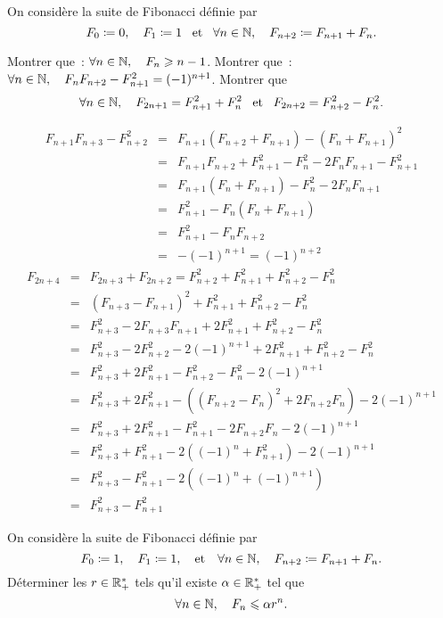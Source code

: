 \documentclass{magnolia}
\begin{document}
On considère la suite de Fibonacci définie par
\[F_0\coloneqq 0,\quad F_1\coloneqq 1 \quad\!\text{et}\quad\! \forall n\in\mathbb{N},\quad F_{n+2}\coloneqq F_{n+1}+F_n.\]
\begin{questions} 
\question Montrer que~: $\forall n\in\mathbb{N},\quad F_n\geqslant n-1$. 
\question Montrer que~: $\forall n\in\mathbb{N},\quad F_nF_{n+2}-F_{n+1}^2=(-1)^{n+1}$. 
\question Montrer que
  \[\forall n\in\mathbb{N},\quad F_{2n+1}=F_{n+1}^2+F_n^2 \quad\!\text{et}\quad\! F_{2n+2}=F_{n+2}^2-F_{n}^2.\]
\end{questions}
\begin{questions}
\question
\question
\begin{eqnarray*}
F_{n+1}F_{n+3}-F_{n+2}^2
&=& F_{n+1}(F_{n+2}+F_{n+1})-(F_n+F_{n+1})^2\\
&=& F_{n+1}F_{n+2}+F_{n+1}^2-F_n^2-2F_n F_{n+1}-F_{n+1}^2\\
&=& F_{n+1}(F_n+F_{n+1}) -F_n^2-2F_n F_{n+1}\\
&=& F_{n+1}^2-F_n(F_n+F_{n+1})\\
&=& F_{n+1}^2-F_n F_{n+2}\\
&=& -(-1)^{n+1} = (-1)^{n+2}
\end{eqnarray*}
\question
\begin{eqnarray*}
F_{2n+4}
&=& F_{2n+3}+F_{2n+2}=F_{n+2}^2+F_{n+1}^2+F_{n+2}^2-F_{n}^2\\
&=& (F_{n+3}-F_{n+1})^2+F_{n+1}^2+F_{n+2}^2-F_{n}^2\\
&=& F_{n+3}^2-2F_{n+3}F_{n+1}+2F_{n+1}^2+F_{n+2}^2-F_{n}^2\\
&=& F_{n+3}^2-2F_{n+2}^2-2(-1)^{n+1}+2F_{n+1}^2+F_{n+2}^2-F_{n}^2\\
&=& F_{n+3}^2+2F_{n+1}^2-F_{n+2}^2-F_{n}^2-2(-1)^{n+1}\\
&=& F_{n+3}^2+2F_{n+1}^2-((F_{n+2}-F_{n})^2+2F_{n+2}F_n)-2(-1)^{n+1}\\
&=& F_{n+3}^2+2F_{n+1}^2-F_{n+1}^2-2F_{n+2}F_n-2(-1)^{n+1}\\
&=& F_{n+3}^2+F_{n+1}^2-2((-1)^n+F_{n+1}^2)-2(-1)^{n+1}\\
&=& F_{n+3}^2-F_{n+1}^2-2((-1)^n+(-1)^{n+1})\\
&=&F_{n+3}^2-F_{n+1}^2
\end{eqnarray*}
\end{questions}

On considère la suite de Fibonacci définie par
\[F_0\coloneqq 1, \quad F_1\coloneqq 1, \quad\text{et}\quad \forall n\in\mathbb{N},\quad F_{n+2}\coloneqq F_{n+1}+F_n.\]
Déterminer les $r\in\mathbb{R}_+^*$ tels qu'il existe $\alpha\in\mathbb{R}_+^*$ tel que
\[\forall n\in\mathbb{N},\quad F_n\leqslant \alpha r^n.\]
\end{document}
